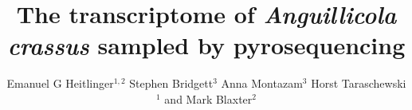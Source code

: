 \documentclass[10pt]{bmc_article}
\newenvironment{bmcformat}{\begin{raggedright}\baselineskip20pt\sloppy\setboolean{publ}{false}}{\end{raggedright}\baselineskip20pt\sloppy}
\begin{document}
\begin{bmcformat}



  \title{The transcriptome of \textit{Anguillicola crassus} sampled by
    pyrosequencing}
 


\author{Emanuel G Heitlinger\correspondingauthor$^{1,2}$%
       Stephen Bridgett$^{3}$%
       Anna Montazam$^{3}$%
       Horst Taraschewski$^1$%
       and Mark Blaxter$^2$%
     }%
      


      \address{%
        \iid(1)Department of Ecology and Parasitology, Zoological
        Institute 1, University of Karlsruhe,%
        Kornblumenstrasse 13, Karlsruhe, Germany\\
        \iid(2)Institute of Evolutionary Biology, The Ashworth laboratories, The University of Edinburgh, King's Buildings Campus, Edinburgh, UK
        \iid(3)The GenePool Sequencing Service, The Ashworth laboratories, The University of Edinburgh, King's Buildings Campus, Edinburgh, UK
      }%

\maketitle


\end{bmcformat}
\end{document}
